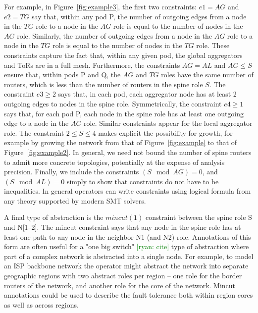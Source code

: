 \documentclass[numbers, 10pt, preprint]{sigplanconf}
\newcommand{\ryan}[1]{\textcolor{green}{[ryan: #1]}}
\newcommand{\sysname}{{\small \sf Methane}\xspace}
\begin{document}
For example, in Figure~\ref{fig:example3}, the first two constraints: $e1 = AG$ and $e2 = TG$ say that, within any pod P, the number of outgoing edges from a node in the $TG$ role to a node in the $AG$ role is equal to the number of nodes in the $AG$ role. Similarly, the number of outgoing edges from a node in the $AG$ role to a node in the $TG$ role is equal to the number of nodes in the $TG$ role. These constraints capture the fact that, within any given pod, the global aggregators and ToRs are in a full mesh. Furthermore, the constraints $AG = AL$ and $AG \leq S$ ensure that, within pods P and Q, the $AG$ and $TG$ roles have the same number of routers, which is less than the number of routers in the spine role $S$.
%
The constraint $e3 \geq 2$ says that, in each pod, each aggregator node has at least 2 outgoing edges to nodes in the spine role. Symmetrically, the constraint $e4 \geq 1$ says that, for each pod P, each node in the spine role has at least one outgoing edge to a node in the $AG$ role. Similar constraints appear for the local aggregator role. The constraint $2 \leq S \leq 4$ makes explicit the possibility for growth, for example by growing the network from that of Figure~\ref{fig:example} to that of Figure~\ref{fig:example2}. In general, we need not bound the number of spine routers to admit more concrete topologies, potentially at the expense of analysis precision. Finally, we include the constraints $(S \mod AG) = 0$, and $(S \mod AL) = 0$ simply to show that constraints do not have to be inequalities. In general operators can write constraints using logical formula from any theory supported by modern SMT solvers.

A final type of abstraction is the $mincut(1)$ constraint between the spine role S and N[1--2]. The mincut constraint says that any node in the spine role has at least one path to any node in the neighbor N1 (and N2) role. Annotations of this form are often useful for a "one big switch" \ryan{cite} type of abstraction where part of a complex network is abstracted into a single node. For example, to model an ISP backbone network the operator might abstract the network into separate geographic regions with two abstract roles per region -- one role for the border routers of the network, and another role for the core of the network. Mincut annotations could be used to describe the fault tolerance both within region cores as well as across regions.

\end{document}
